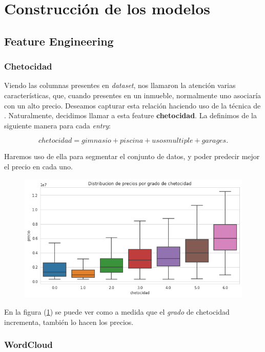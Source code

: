 \section{Construcción de los modelos}

    \subsection{Feature Engineering}
    \subsubsection{Chetocidad}
    
    Viendo las columnas presentes en \emph{dataset}, nos llamaron la atención varias características, que, cuando presentes en un inmueble, normalmente uno asociaría con un alto precio. Deseamos capturar esta relación haciendo uso de la técnica de \fe. Naturalmente, decidimos llamar a esta feature \textbf{chetocidad}. La definimos de la siguiente manera para cada \emph{entry}:

        $$chetocidad = gimnasio + piscina + usosmultiple + garages.$$
    
    Haremos uso de ella para segmentar el conjunto de datos, y poder predecir mejor el precio en cada uno.

    \begin{figure}[H]
        \centering
        \includegraphics[scale=0.7]{img/cmp/precio/dist-chetocidad.png}
        \caption{}
        \label{fig:precio-dist-chetocidad}
    \end{figure}
    
    En la figura (\ref{fig:precio-dist-chetocidad}) se puede ver como a medida que el \emph{grado} de chetocidad incrementa, también lo hacen los precios.
    
    \subsubsection{WordCloud}
    
